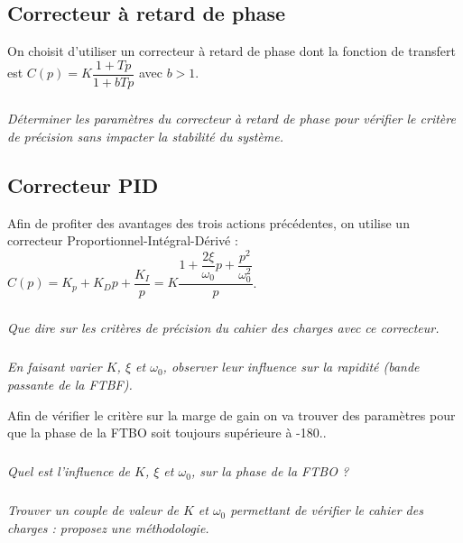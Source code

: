 \documentclass[10pt,fleqn]{article} %
\begin{document}
\begin{multicols}{2}
\subsection*{Correcteur à retard de phase}
On choisit d’utiliser un correcteur à retard de phase dont la fonction de transfert est $C(p)=K \dfrac{1+Tp}{1+bTp}$ avec $b>1$.
\subparagraph{}
\textit{Déterminer les paramètres du correcteur à retard de phase pour vérifier le critère de précision sans impacter la stabilité du système.}
\ifprof
\begin{corrige}
\end{corrige}
\else
\fi


\subsection*{Correcteur PID}
Afin de profiter des avantages des trois actions précédentes, on utilise un correcteur Proportionnel-Intégral-Dérivé :
$C(p)=K_p+K_D p+\dfrac{K_I}{p}=K\dfrac{1+\dfrac{2\xi}{\omega_0}  p+\dfrac{p^2}{\omega_0^2}}{p}$.
  
\subparagraph{}
\textit{Que dire sur les critères de précision du cahier des charges avec ce correcteur.}
\ifprof
\begin{corrige}
\end{corrige}
\else
\fi

\subparagraph{}
\textit{En faisant varier $K$, $\xi$ et $\omega_0$, observer leur influence sur la rapidité (bande passante de la FTBF).}
\ifprof
\begin{corrige}
\end{corrige}
\else
\fi

Afin de vérifier le critère sur la marge de gain on va trouver des paramètres pour que la phase de la FTBO soit toujours supérieure à -180\degres..
\subparagraph{}
\textit{Quel est l’influence de $K$, $\xi$ et $\omega_0$, sur la phase de la FTBO ? }
\ifprof
\begin{corrige}
\end{corrige}
\else
\fi

\subparagraph{}
\textit{Trouver un couple de valeur de $K$ et $\omega_0$ permettant de vérifier le cahier des charges : proposez une méthodologie.}
\ifprof
\begin{corrige}
\end{corrige}
\else
\fi




\end{multicols}
\end{document}
